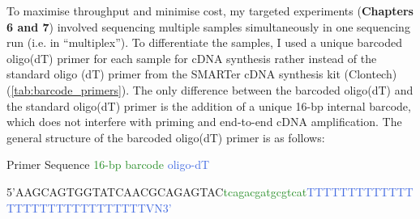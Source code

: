 \begin{landscape}
	To maximise throughput and minimise cost, my targeted experiments (\textbf{Chapters 6 and 7}) involved sequencing multiple samples simultaneously in one sequencing run (i.e. in “multiplex”). To differentiate the samples, I used a unique barcoded oligo(dT) primer for each sample for cDNA synthesis rather instead of the standard oligo (dT) primer from the SMARTer cDNA synthesis kit (Clontech) (\cref{tab:barcode_primers}). The only difference between the barcoded oligo(dT) and the standard oligo(dT) primer is the addition of a unique 16-bp internal barcode, which does not interfere with priming and end-to-end cDNA amplification. The general structure of the barcoded oligo(dT) primer is as follows:
	
	\hspace{5cm} \textcolor{RedOrange}{Primer Sequence} \hspace{2cm}   \textcolor{ForestGreen}{16-bp barcode}   \hspace{2cm} \textcolor{RoyalBlue}{oligo-dT}
	\vspace{-0.5cm}
	\begin{center}
		5'\textcolor{RedOrange}{AAGCAGTGGTATCAACGCAGAGTAC}\textcolor{ForestGreen}{tcagacgatgcgtcat}\textcolor{RoyalBlue}{TTTTTTTTTTTTTTTTTTTTTTTTTTTTTTVN3’}
	\end{center}


\end{landscape}
